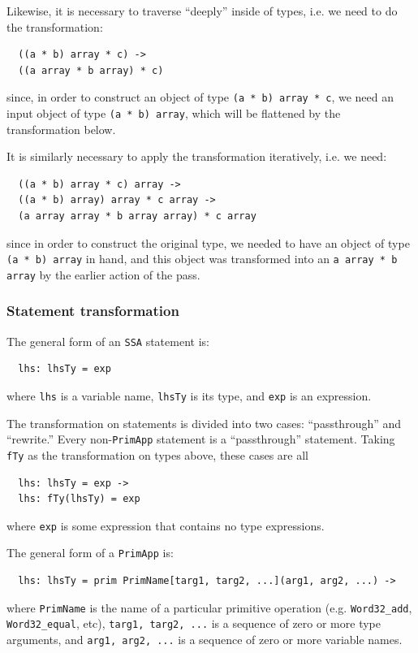 \documentclass[leqno,11pt]{article}
\begin{document}
Likewise, it is necessary to traverse ``deeply'' inside of types, i.e. we need
to do the transformation:
\begin{verbatim}
  ((a * b) array * c) ->
  ((a array * b array) * c)
\end{verbatim}
since, in order to construct an object of type \texttt{(a * b) array * c}, we
need an input object of type \texttt{(a * b) array}, which will be flattened by
the transformation below.

It is similarly necessary to apply the transformation iteratively, i.e. we need:
\begin{verbatim}
  ((a * b) array * c) array ->
  ((a * b) array) array * c array ->
  (a array array * b array array) * c array
\end{verbatim}
since in order to construct the original type, we needed to have an object of
type \texttt{(a * b) array} in hand, and this object was transformed into an
\texttt{a array * b array} by the earlier action of the pass.

\subsubsection{Statement transformation}
The general form of an \texttt{SSA} statement is:
\begin{verbatim}
  lhs: lhsTy = exp
\end{verbatim}
where \texttt{lhs} is a variable name, \texttt{lhsTy} is its type, and
\texttt{exp} is an expression.

The transformation on statements is divided into two cases: ``passthrough'' and
``rewrite.'' Every non-\texttt{PrimApp} statement is a ``passthrough''
statement. Taking \texttt{fTy} as the transformation on types above, these cases
are all
\begin{verbatim}
  lhs: lhsTy = exp ->
  lhs: fTy(lhsTy) = exp
\end{verbatim}
where \texttt{exp} is some expression that contains no type expressions.

The general form of a \texttt{PrimApp} is:
\begin{verbatim}
  lhs: lhsTy = prim PrimName[targ1, targ2, ...](arg1, arg2, ...) ->
\end{verbatim}
where \texttt{PrimName} is the name of a particular primitive operation (e.g.
\texttt{Word32\_add}, \texttt{Word32\_equal}, etc), \texttt{targ1, targ2, ...}
is a sequence of zero or more type arguments, and \texttt{arg1, arg2, ...} is a
sequence of zero or more variable names.
\end{document}
